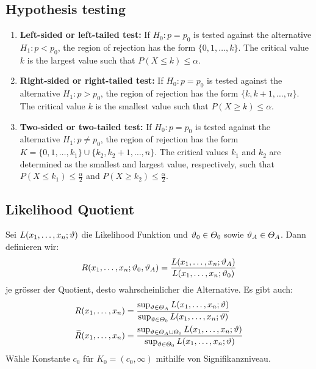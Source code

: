 \subsection*{Hypothesis testing}
\begin{enumerate}
  \item \textbf{Left-sided or left-tailed test: } If $H_0 : p = p_0$ is tested against the alternative $H_1 : p < p_0$, the region of rejection has the form $\{0, 1, \ldots, k\}$. The critical value $k$ is the largest value such that $P(X \leq k) \leq \alpha$.
  \item \textbf{Right-sided or right-tailed test: } If \(H_0 : p = p_0\) is tested against the alternative \(H_1 : p > p_0\), the region of rejection has the form \(\{k, k + 1, \ldots , n\}\). The critical value \(k\) is the smallest value such that \(P(X \geq k) \leq \alpha\).
  \item \textbf{Two-sided or two-tailed test: } If \(H_0 : p = p_0\) is tested against the alternative \(H_1 : p \neq p_0\), the region of rejection has the form \(K = \{0, 1, \ldots , k_1\} \cup \{k_2, k_2+1, \ldots , n\}\). The critical values \(k_1\) and \(k_2\) are determined as the smallest and largest value, respectively, such that \(P(X \leq k_1) \leq \frac{\alpha}{2}\) and \(P(X \geq k_2) \leq \frac{\alpha}{2}\).

\end{enumerate}

\subsection*{Likelihood Quotient}
Sei $L (x_1, \dots, x_n; \vartheta)$ die Likelihood Funktion und $\vartheta_0 \in
  \varTheta_0$ sowie $\vartheta_A \in \varTheta_A$. Dann definieren wir:
\begin{align*}
  R (x_1, \dots, x_n; \vartheta_0, \vartheta_A) = \frac{L (x_1, \dots, x_n; \vartheta_A)}{L (x_1, \dots, x_n; \vartheta_0)}
\end{align*}
je grösser der Quotient, desto wahrscheinlicher die Alternative. Es gibt auch:
\begin{align*}
  R (x_1, \dots, x_n)             & = \frac{ \sup_{\vartheta \in \varTheta_A} L (x_1, \dots, x_n; \vartheta)}{\sup_{\vartheta \in \varTheta_0} L (x_1, \dots, x_n; \vartheta)}                  \\
  \widetilde{R} (x_1, \dots, x_n) & = \frac{ \sup_{\vartheta \in \varTheta_A \cup \varTheta_0} L (x_1, \dots, x_n; \vartheta)}{\sup_{\vartheta \in \varTheta_0} L (x_1, \dots, x_n; \vartheta)} \\
\end{align*}
Wähle Konstante $c_0$ für $K_0 =  (c_0, \infty)$ mithilfe von Signifikanzniveau.
